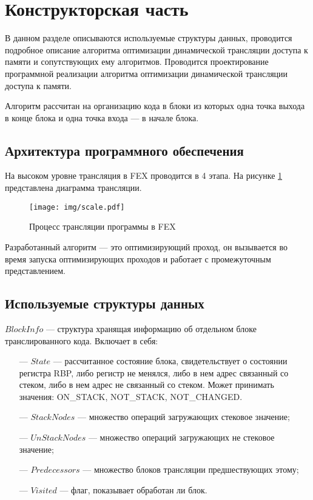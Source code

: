 \section{Конструкторская часть}

В данном разделе описываются используемые структуры данных, проводится подробное описание алгоритма оптимизации динамической трансляции доступа к памяти и сопутствующих ему алгоритмов. Проводится проектирование программной реализации алгоритма оптимизации динамической трансляции доступа к памяти.

Алгоритм рассчитан на организацию кода в блоки из которых одна точка выхода в конце блока и одна точка входа --- в начале блока.

\subsection{Архитектура программного обеспечения}

На высоком уровне трансляция в FEX проводится в 4 этапа. На рисунке \ref{fig:trans} представлена диаграмма трансляции.

\begin{figure}[hbtp]
	\centering
	\texttt{[image: img/scale.pdf]}
	\caption{Процесс трансляции программы в FEX}
	\label{fig:trans}
\end{figure}

Разработанный алгоритм --- это оптимизирующий проход, он вызывается во время запуска оптимизирующих проходов и работает с промежуточным представлением.

\subsection{Используемые структуры данных}

$BlockInfo$ --- структура хранящая информацию об отдельном блоке транслированного кода. Включает в себя:

\begin{itemize}[leftmargin=1.6\parindent]
	\item[---] $State$ --- рассчитанное состояние блока, свидетельствует о состоянии регистра RBP, либо регистр не менялся, либо в нем адрес связанный со стеком, либо в нем адрес не связанный со стеком. Может принимать значения: ON\_STACK, NOT\_STACK, NOT\_CHANGED.
	\item[---] $StackNodes$ --- множество операций загружающих стековое значение;
	\item[---] $UnStackNodes$ --- множество операций загружающих не стековое значение;
	\item[---] $Predecessors$ --- множество блоков трансляции предшествующих этому;
	\item[---] $Visited$ --- флаг, показывает обработан ли блок.
\end{itemize}

